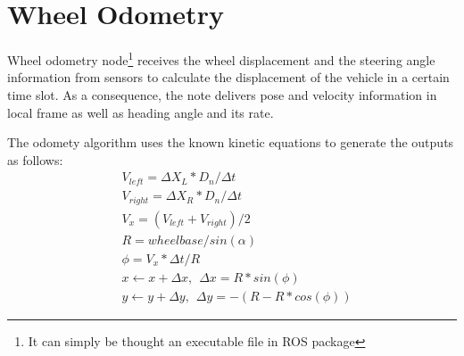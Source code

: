 \section{Wheel Odometry}\label{sec:wheel_odometry}
Wheel odometry node\footnote{It can simply be thought an executable file in ROS package} receives the wheel displacement and the steering angle information from sensors to calculate the displacement of the vehicle in a certain time slot. As a consequence, the note delivers pose and velocity information in local frame as well as heading angle and its rate.
\par The odomety algorithm uses the known kinetic equations to generate the outputs as follows:
\\
\begin{align}
  &V_{left} = \Delta X_L*D_n/ \Delta t\\
  &V_{right} = \Delta X_R*D_n/ \Delta t\\
  &V_x = (V_{left}+V_{right})/2\\
  &R = wheelbase/sin(\alpha)\\
  &\phi = V_x * \Delta t / R\\
  &x \leftarrow x+\Delta x, \hspace{5pt} \Delta x = R * sin(\phi)\\
  &y \leftarrow y+\Delta y, \hspace{5pt} \Delta y = -(R-R*cos(\phi))
\end{align}

